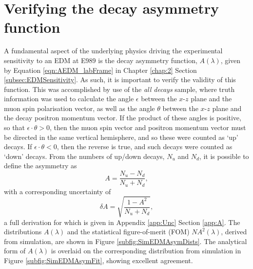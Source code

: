  

\section{Verifying the decay asymmetry function}\label{sec:DecayAsymVerification}

A fundamental aspect of the underlying physics driving the experimental sensitivity to an EDM at E989 is the decay asymmetry function, $A(\lambda)$, given by Equation \ref{eqn:AEDM_labFrame} in Chapter \ref{chap:2} Section \ref{subsec:EDMSensitivity}. As such, it is important to verify the validity of this function. This was accomplished by use of the \textit{all decays} sample, where truth information was used to calculate the angle $\epsilon$ between the $x$-$z$ plane and the muon spin polarisation vector, as well as the angle $\theta$ between the $x$-$z$ plane and the decay positron momentum vector. If the product of these angles is positive, so that $\epsilon\cdot\theta > 0$, then the muon spin vector and positron momentum vector must be directed in the same vertical hemisphere, and so these were counted as `up' decays. If $\epsilon\cdot\theta < 0$, then the reverse is true, and such decays were counted as `down' decays. From the numbers of up/down decays, $N_{u}$ and $N_{d}$, it is possible to define the asymmetry as 
%
\begin{equation}
  A = \frac{N_{u}-N_{d}}{N_{u}+N_{d}},
  \label{eqn:UpDownAsym}
\end{equation}
%
with a corresponding uncertainty of 
\begin{equation}
  \delta A = \sqrt{\frac{1-A^{2}}{N_{u}+N_{d}}},
  \label{eqn:UpDownAsymError}
\end{equation}
%
a full derivation for which is given in Appendix \ref{app:Unc} Section \ref{app:A}. The distributions $A(\lambda)$ and the statistical figure-of-merit (FOM) $NA^{2}(\lambda)$, derived from simulation, are shown in Figure \ref{subfig:SimEDMAsymDists}. The analytical form of $A(\lambda)$ is overlaid on the corresponding distribution from simulation in Figure \ref{subfig:SimEDMAsymFit}, showing excellent agreement. 

